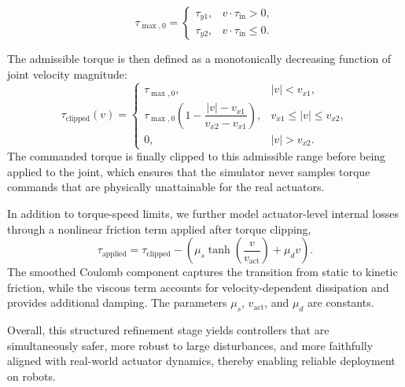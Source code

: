 \begin{equation}
\tau_{\max,0} =
\begin{cases}
\tau_{y1}, & v \cdot \tau_{\text{in}} > 0, \\
\tau_{y2}, & v \cdot \tau_{\text{in}} \le 0 .
\end{cases}
\end{equation}

The admissible torque is then defined as a monotonically decreasing function of joint velocity magnitude:
\begin{equation}
\tau_{\text{clipped}}(v) =
\begin{cases}
\tau_{\max,0}, & |v| < v_{x1}, \\
\tau_{\max,0} \left( 1 - \dfrac{|v| - v_{x1}}{v_{x2} - v_{x1}} \right),
& v_{x1} \le |v| \le v_{x2}, \\
0, & |v| > v_{x2}.
\end{cases}
\end{equation}
The commanded torque is finally clipped to this admissible range before being applied to the joint, which ensures that the simulator never samples torque commands that are physically unattainable for the real actuators.

In addition to torque-speed limits, we further model actuator-level internal losses
through a nonlinear friction term applied after torque clipping,
\begin{equation}
\tau_{\text{applied}} =
\tau_{\text{clipped}}
- \left(
\mu_s \tanh\!\left( \frac{v}{v_{\text{act}}} \right)
+ \mu_d v
\right).
\end{equation}
The smoothed Coulomb component captures the transition from static to kinetic friction,
while the viscous term accounts for velocity-dependent dissipation and provides
additional damping. The parameters $\mu_s$, $v_{\text{act}}$, and $\mu_d$ are constants.

Overall, this structured refinement stage yields controllers that are simultaneously safer, more robust to large disturbances, and more faithfully aligned with real-world actuator dynamics, thereby enabling reliable deployment on robots. 



